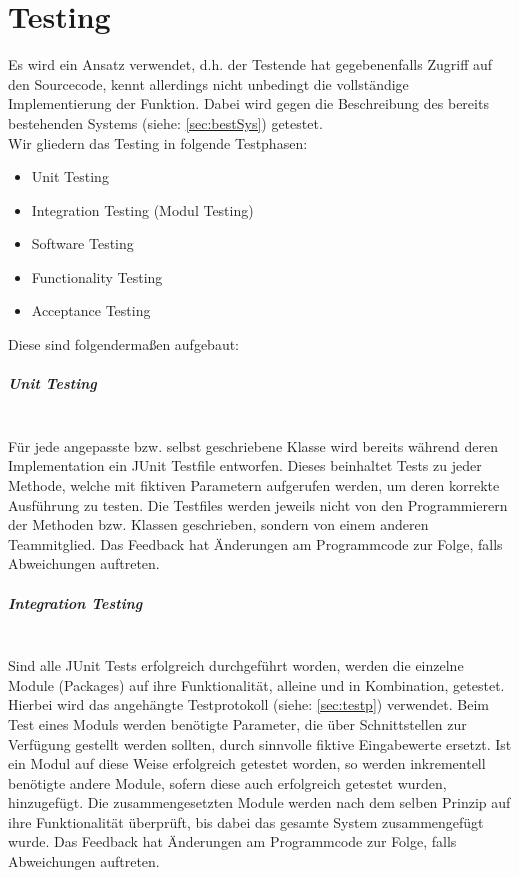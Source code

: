 \documentclass[10pt,a4paper]{article}
\newcommand{\G}[1]{\glqq\text{#1}\grqq} %
\begin{document}
\section{Testing}
Es wird ein \G{Grey Box testing} Ansatz verwendet, d.h. der Testende hat gegebenenfalls Zugriff auf den Sourcecode, kennt allerdings nicht unbedingt die vollständige Implementierung der Funktion. Dabei wird gegen die Beschreibung des bereits bestehenden Systems (siehe: \autoref{sec:bestSys}) getestet.\\
Wir gliedern das Testing in folgende Testphasen:
{\small\begin{itemize}
\item Unit Testing
\item Integration Testing (Modul Testing)
\item Software Testing
\item Functionality Testing
\item Acceptance Testing\\
\end{itemize}}
Diese sind folgendermaßen aufgebaut:
\subparagraph{Unit Testing}\ \\
Für jede angepasste bzw. selbst geschriebene Klasse wird bereits während deren Implementation ein JUnit Testfile entworfen. Dieses beinhaltet Tests zu jeder Methode, welche mit fiktiven Parametern aufgerufen werden, um deren korrekte Ausführung zu testen. Die Testfiles werden jeweils nicht von den Programmierern der Methoden bzw. Klassen geschrieben, sondern von einem anderen Teammitglied. Das Feedback hat Änderungen am Programmcode zur Folge, falls Abweichungen auftreten.

\subparagraph{Integration Testing}\ \\
Sind alle JUnit Tests erfolgreich durchgeführt worden, werden die einzelne Module (Packages) auf ihre Funktionalität, alleine und in Kombination, getestet. Hierbei wird das angehängte Testprotokoll (siehe: \autoref{sec:testp}) verwendet. Beim Test eines Moduls werden benötigte Parameter, die über Schnittstellen zur Verfügung gestellt werden sollten, durch sinnvolle fiktive Eingabewerte ersetzt. Ist ein Modul auf diese Weise erfolgreich getestet worden, so werden inkrementell benötigte andere Module, sofern diese auch erfolgreich getestet wurden, hinzugefügt. Die zusammengesetzten Module werden nach dem selben Prinzip auf ihre Funktionalität überprüft, bis dabei das gesamte System zusammengefügt wurde. Das Feedback hat Änderungen am Programmcode zur Folge, falls Abweichungen auftreten.
\end{document}
